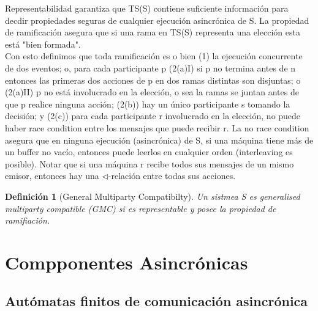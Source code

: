 \documentclass[paper=a4, fontsize=11pt, spanish]{scrartcl} %
\numberwithin{equation}{section} %
\numberwithin{figure}{section} %
\numberwithin{table}{section} %
\newtheorem{definition}{Definición}
\begin{document}
Representabilidad garantiza que TS(S) contiene suficiente información para decdir propiedades seguras de cualquier ejecución asincrónica de S. La propiedad de ramificación asegura que si una rama en TS(S) representa una elección esta está "bien formada".\\
 
Con esto definimos que toda ramificación es o bien (1) la ejecución concurrente de dos eventos; o, para cada participante p (2(a)I) si p no termina antes de n entonces las primeras dos acciones de p en dos ramas distintas son disjuntas; o (2(a)II) p no está involucrado en la elección, o sea la ramas se juntan antes de que p realice ninguna acción; (2(b)) hay un único participante s tomando la decisión; y (2(c)) para cada participante r involucrado en la elección, no puede haber race condition entre los mensajes que puede recibir r. La no race condition asegura que en ninguna ejecución (asincrónica) de S, si una máquina tiene más de un buffer no vacío, entonces puede leerlos en cualquier orden (interleaving es posible). Notar que si una máquina r recibe todos sus mensajes de un mismo emisor, entonces hay una $\triangleleft$-relación entre todas sus acciones.

\begin{definition}[General Multiparty Compatibilty] Un sistmea S es generalised multiparty compatible (GMC) si es representable y posee la propiedad de ramifiación. 
\end{definition}


\section{Compponentes Asincrónicas}

\subsection{Autómatas finitos de comunicación asincrónica}
\end{document}
